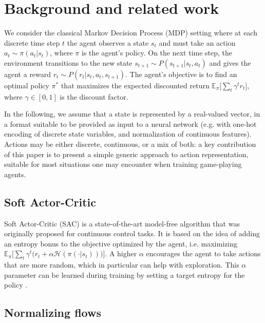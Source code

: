 \documentclass[letterpaper]{article} \usepackage{aaai20}  \usepackage{times}  \usepackage{helvet} \usepackage{courier}  \usepackage[hyphens]{url}  \usepackage{graphicx} \urlstyle{rm} \def\UrlFont{\rm}  \usepackage{graphicx}  \usepackage[section]{placeins}
\renewcommand{\H}{\mathcal{H}}
\begin{document}
\section{Background and related work}

We consider the classical Markov Decision Process (MDP) setting where at each discrete time step $t$ the agent observes a state $s_t$ and must take an action $a_t \sim \pi(a_t | s_t)$, where $\pi$ is the agent's policy.
On the next time step, the environment transitions to the new state $s_{t+1} \sim P(s_{t+1} | s_t, a_t)$ and gives the agent a reward $r_t \sim P(r_t | s_t, a_t, s_{t+1})$.
The agent's objective is to find an optimal policy $\pi^*$ that maximizes the expected discounted return $\mathbb{E}_\pi\big[\sum_t \gamma^t r_t\big]$, where $\gamma \in [0, 1]$ is the discount factor.

In the following, we assume that a state is represented by a real-valued vector, in a format suitable to be provided as input to a neural network (e.g. with one-hot encoding of discrete state variables, and normalization of continuous features).
Actions may be either discrete, continuous, or a mix of both: a key contribution of this paper is to present a simple generic approach to action representation, suitable for most situations one may encounter when training game-playing agents.

\subsection{Soft Actor-Critic}

Soft Actor-Critic (SAC) \citep{haarnoja2018soft,haarnoja2018softapplications} is a state-of-the-art model-free algorithm that was originally proposed for continuous control tasks.
It is based on the idea of adding an entropy bonus to the objective optimized by the agent, i.e. maximizing $\mathbb{E}_\pi \Big[ \sum_t \gamma^t \big(r_t + \alpha \H(\pi(\cdot | s_t)) \big) \Big]$.
A higher $\alpha$ encourages the agent to take actions that are more random, which in particular can help with exploration. This $\alpha$ parameter can be learned during training by setting a target entropy for the policy \cite{haarnoja2018softapplications}.



\subsection{Normalizing flows}
\end{document}

